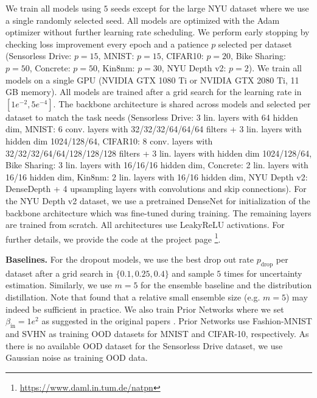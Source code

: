 We train all models using $5$ seeds except for the large NYU dataset where we use a single randomly selected seed. All models are optimized with the Adam optimizer without further learning rate scheduling. We perform early stopping by checking loss improvement every epoch and a patience $p$ selected per dataset (Sensorless Drive: $p=15$, MNIST: $p=15$, CIFAR10: $p=20$, Bike Sharing: $p=50$, Concrete: $p=50$, Kin8nm: $p=30$, NYU Depth v2: $p=2$). We train all models on a single GPU (NVIDIA GTX 1080 Ti or NVIDIA GTX 2080 Ti, 11 GB memory). All models are trained after a grid search for the learning rate in $[1e^{-2}, 5e^{-4}]$. The backbone architecture is shared across models and selected per dataset to match the task needs (Sensorless Drive: 3 lin. layers with 64 hidden dim, MNIST: 6 conv. layers with 32/32/32/64/64/64 filters + 3 lin. layers with hidden dim 1024/128/64, CIFAR10: 8 conv. layers with 32/32/32/64/64/128/128/128 filters + 3 lin. layers with hidden dim 1024/128/64, Bike Sharing: 3 lin. layers with 16/16/16 hidden dim, Concrete: 2 lin. layers with 16/16 hidden dim, Kin8nm: 2 lin. layers with 16/16 hidden dim, NYU Depth v2: DenseDepth + 4 upsampling layers with convolutions and skip connections). For the NYU Depth v2 dataset, we use a pretrained DenseNet for initialization of the backbone architecture which was fine-tuned during training. The remaining layers are trained from scratch. All architectures use LeakyReLU activations. For further details, we provide the code at the project page \footnote{\url{https://www.daml.in.tum.de/natpn}}.

\textbf{Baselines.} For the dropout models, we use the best drop out rate $p_{\text{drop}}$ per dataset after a grid search in $\{0.1, 0.25, 0.4\}$ and sample $5$ times for uncertainty estimation. Similarly, we use $m=5$ for the ensemble baseline and the distribution distillation. Note that \citet{dataset-shift} found that a relative small ensemble size (e.g. $m=5$) may indeed be sufficient in practice. We also train Prior Networks where we set $\beta_\text{in}=1e^2$ as suggested in the original papers \citep{PriorNetworks, reverse-kl}. Prior Networks use Fashion-MNIST and SVHN as training OOD datasets for MNIST and CIFAR-10, respectively. As there is no available OOD dataset for the Sensorless Drive dataset, we use Gaussian noise as training OOD data. 

